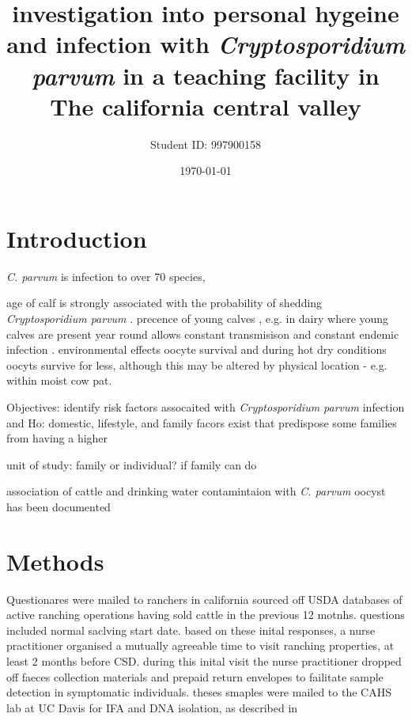 \documentclass[12pt]{article}
\title{investigation into personal hygeine and infection with \emph{Cryptosporidium parvum} in a teaching facility in The california central valley}
\author{Student ID: 997900158}
\date{\today}
\begin{document}
	\maketitle
	\begin{abstract}


	\end{abstract}


	\section{Introduction} 
	\emph{C. parvum} is infection to over 70 species, \cite{Casemore1997}


	age of calf is strongly associated with the probability of shedding \emph{Cryptosporidium parvum} \cite{Atwill1999a}.
	precence of young calves , e.g. in dairy where young calves are present year round allows constant transmisison and constant endemic infection .\cite{Atwill1998}
	environmental effects oocyte survival and 
	during hot dry conditions oocyts survive for less, although this may be altered by physical location - e.g. within moist cow pat. \cite{Robertson1992}
		
	Objectives: identify risk factors assocaited with \emph{Cryptosporidium parvum} infection and
	Ho: domestic, lifestyle, and family facors exist that predispose some families from having a higher 

	unit of study: family or individual?
		if family can do 

		association of cattle and drinking water contamintaion with \emph{C. parvum} oocyst has been documented \cite{Ong1996}
	\section{Methods} 
		Questionares were mailed to ranchers in california sourced off USDA databases of active ranching operations having sold cattle in the previous 12 motnhs.
		questions included normal saclving start date.
		based on these inital responses, a nurse practitioner organised a mutually agreeable time to visit ranching properties, at least 2 months before CSD.	%
	during this inital visit the nurse practitioner dropped off faeces collection materials and prepaid return envelopes to failitate sample detection in symptomatic individuals.		%
		theses smaples were mailed to the CAHS lab at UC Davis for IFA and DNA isolation,  as described in \cite{Atwill1999}
\end{document}
